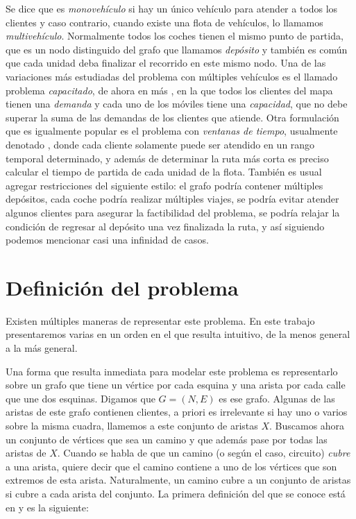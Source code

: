 Se dice que  es \emph{monovehículo} si hay un único vehículo para atender a todos los clientes y caso contrario, cuando existe una flota de vehículos, lo llamamos \emph{multivehículo}. Normalmente todos los coches tienen el mismo punto de partida, que es un nodo distinguido del grafo que llamamos \emph{depósito} y también es común que cada unidad deba finalizar el recorrido en este mismo nodo. Una de las variaciones más estudiadas del problema con múltiples vehículos es el llamado problema \emph{capacitado}, de ahora en más , en la que todos los clientes del mapa tienen una \emph{demanda} y cada uno de los móviles tiene una \emph{capacidad}, que no debe superar la suma de las demandas de los clientes que atiende. Otra formulación que es igualmente popular es el problema con \emph{ventanas de tiempo}, usualmente denotado , donde cada cliente solamente puede ser atendido en un rango temporal determinado, y además de determinar la ruta más corta es preciso calcular el tiempo de partida de cada unidad de la flota. También es usual agregar restricciones del siguiente estilo: el grafo podría contener múltiples depósitos, cada coche podría realizar múltiples viajes, se podría evitar atender algunos clientes para asegurar la factibilidad del problema, se podría relajar la condición de regresar al depósito una vez finalizada la ruta, y así siguiendo podemos mencionar casi una infinidad de casos.


\section{Definición del problema}

Existen múltiples maneras de representar este problema. En este trabajo presentaremos varias en un orden en el que resulta intuitivo, de la menos general a la más general. 

Una forma que resulta inmediata para modelar este problema es representarlo sobre un grafo que tiene un vértice por cada esquina y una arista por cada calle que une dos esquinas. Digamos que $G = (N, E)$ es ese grafo. Algunas de las aristas de este grafo contienen clientes, a priori es irrelevante si hay uno o varios sobre la misma cuadra, llamemos a este conjunto de aristas $X$. Buscamos ahora un conjunto de vértices que sea un camino y que además pase por todas las aristas de $X$. Cuando se habla de que un camino (o según el caso, circuito) \emph{cubre} a una arista, quiere decir que el camino contiene a uno de los vértices que son extremos de esta arista. Naturalmente, un camino cubre a un conjunto de aristas si cubre a cada arista del conjunto. La primera definición del  que se conoce está en \cite{tagliavini} y es la siguiente:

